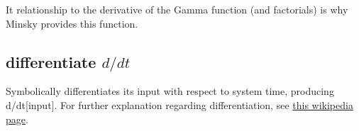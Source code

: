 It relationship to the derivative of the Gamma function (and
factorials) is why Minsky provides this function.

\subsection{differentiate $d/dt$}\label{Operation:differentiate}
Symbolically differentiates its input with respect to system time,
producing d/dt[input].  For further explanation regarding
differentiation, see
\href{https://en.wikipedia.org/wiki/Derivative}{this wikipedia page}.

%
%
%
%

